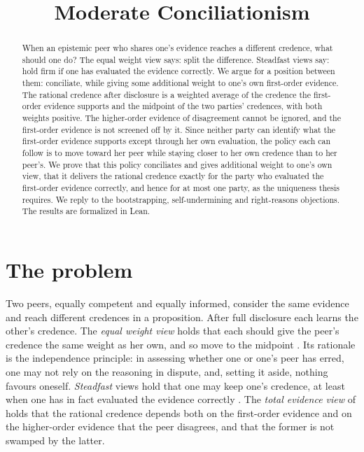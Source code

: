 \documentclass{situationist-preprint}
\title{Moderate Conciliationism}
\begin{document}
\maketitle

\begin{abstract}
When an epistemic peer who shares one's evidence reaches a different credence, what should one do? The equal weight view says: split the difference. Steadfast views say: hold firm if one has evaluated the evidence correctly. We argue for a position between them: conciliate, while giving some additional weight to one's own first-order evidence. The rational credence after disclosure is a weighted average of the credence the first-order evidence supports and the midpoint of the two parties' credences, with both weights positive. The higher-order evidence of disagreement cannot be ignored, and the first-order evidence is not screened off by it. Since neither party can identify what the first-order evidence supports except through her own evaluation, the policy each can follow is to move toward her peer while staying closer to her own credence than to her peer's. We prove that this policy conciliates and gives additional weight to one's own view, that it delivers the rational credence exactly for the party who evaluated the first-order evidence correctly, and hence for at most one party, as the uniqueness thesis requires. We reply to the bootstrapping, self-undermining and right-reasons objections. The results are formalized in Lean.
\end{abstract}

\section{The problem}

Two peers, equally competent and equally informed, consider the same evidence and reach different credences in a proposition. After full disclosure each learns the other's credence. The \emph{equal weight view} holds that each should give the peer's credence the same weight as her own, and so move to the midpoint \citep{Elga2007,Christensen2007,Feldman2007}. Its rationale is the independence principle: in assessing whether one or one's peer has erred, one may not rely on the reasoning in dispute, and, setting it aside, nothing favours oneself. \emph{Steadfast} views hold that one may keep one's credence, at least when one has in fact evaluated the evidence correctly \citep{Kelly2005}. The \emph{total evidence view} of \citet{Kelly2010} holds that the rational credence depends both on the first-order evidence and on the higher-order evidence that the peer disagrees, and that the former is not swamped by the latter.
\end{document}
